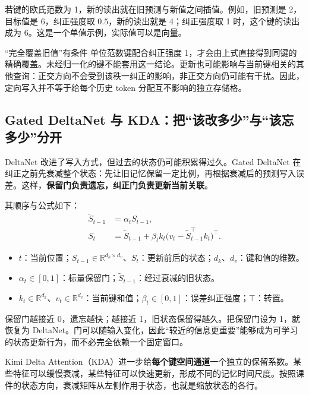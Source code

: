 \documentclass[11pt,a4paper]{article}
\begin{document}
若键的欧氏范数为 1，新的读出就在旧预测与新值之间插值。例如，旧预测是 2，目标值是 6，纠正强度取 $0.5$，新的读出就是 4；纠正强度取 1 时，这个键的读出成为 6。这是一个单值示例，实际值可以是向量。

\begin{warningbox}{“完全覆盖旧值”有条件}
单位范数键配合纠正强度 1，才会由上式直接得到同键的精确覆盖。未经归一化的键不能套用这一结论。更新也可能影响与当前键相关的其他查询：正交方向不会受到该秩一纠正的影响，非正交方向仍可能有干扰。因此，定向写入并不等于给每个历史 token 分配互不影响的独立存储格。
\end{warningbox}

\subsection{Gated DeltaNet 与 KDA：把“该改多少”与“该忘多少”分开}

DeltaNet 改进了写入方式，但过去的状态仍可能积累得过久。Gated DeltaNet 在纠正之前先衰减整个状态：先让旧记忆保留一定比例，再根据衰减后的预测写入误差。这样，\textbf{保留门负责遗忘，纠正门负责更新当前关联}。

其顺序与公式如下：
$$
\begin{aligned}
\widetilde S_{t-1}&=\alpha_t S_{t-1},\\
S_t&=\widetilde S_{t-1}
+\beta_t k_t\bigl(v_t-\widetilde S_{t-1}^{\top}k_t\bigr)^{\top}.
\end{aligned}
$$
\begin{itemize}
  \item $t$：当前位置；$S_{t-1}\in\mathbb R^{d_k\times d_v}$、$S_t$：更新前后的状态；$d_k$、$d_v$：键和值的维数。
  \item $\alpha_t\in[0,1]$：标量保留门；$\widetilde S_{t-1}$：经过衰减的旧状态。
  \item $k_t\in\mathbb R^{d_k}$、$v_t\in\mathbb R^{d_v}$：当前键和值；$\beta_t\in[0,1]$：误差纠正强度；$\top$：转置。
\end{itemize}

保留门越接近 0，遗忘越快；越接近 1，旧状态保留得越久。把保留门设为 1，就恢复为 DeltaNet。门可以随输入变化，因此“较近的信息更重要”能够成为可学习的状态更新行为，而不必完全依赖一个固定窗口。

Kimi Delta Attention（KDA）进一步给\textbf{每个键空间通道}一个独立的保留系数。某些特征可以缓慢衰减，某些特征可以快速更新，形成不同的记忆时间尺度。按照课件的状态方向，衰减矩阵从左侧作用于状态，也就是缩放状态的各行。
\end{document}
